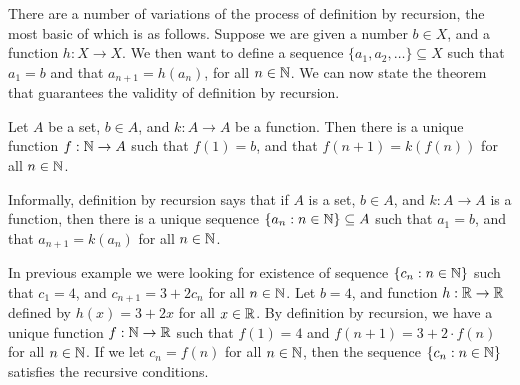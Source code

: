 \documentclass[a4paper,english,12pt]{article}
\begin{document}
There are a number of variations of the process of definition by recursion, the most basic of which is as follows. Suppose we are given a number $b \in X$, and a function $h:X \to X$. We then want to define a sequence $\{a_1,a_2, \ldots\} \subseteq X$ such that $a_1=b$ and that $a_{n+1}=h(a_n)$, for all  $n \in \mathbb{N}$. %
We can now state the theorem that guarantees the validity of definition by recursion.    
\begin{thm}
\label{Thm:DfnRcrsn} 
Let $A$ be a set, $b \in A$, and $k : A \to A$ be a function. Then there is a unique function $f : \mathbb{N} \to A$ such that $f(1) = b$, and that $f(n + 1) = k(f(n))$ for all $n \in \mathbb{N}$.
\end{thm}
\begin{rem} Informally, definition by recursion says that if $A$ is a set, $b \in A$, and $k : 
A \to A$ is a function, then there is a unique sequence $\{a_n: n \in \mathbb{N}\} \subseteq A$ such that $a_1 = b$, and that $a_{n+1} = k(a_n)$ for all $n \in \mathbb{N}$. 
\end{rem}
\begin{exmp}\label{Exmp:Recurse} In previous example we were looking for existence of sequence $\{c_n: n \in \mathbb{N}\}$ such that $c_1 = 4$, and $c_{n+1} = 3 + 2c_n$ for all $n \in \mathbb{N}$. Let $b = 4$, and function $h : \mathbb{R} \to \mathbb{R}$ defined by $h(x) = 3+2x$ for all $x \in \mathbb{R}$. By definition by recursion, we have a unique function $f : \mathbb{N} \to \mathbb{R}$ such that $f(1) = 4$ and  $f(n + 1) = 3 + 2 \cdot f(n)$ for all $n \in \mathbb{N}$. If we let $c_n = f(n)$ for all $n \in \mathbb{N}$, then the sequence $\{c_n: n \in \mathbb{N}\}$ satisfies the recursive conditions. %
\end{exmp}
\end{document}
